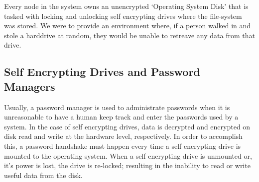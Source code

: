 \documentclass[11pt]{article} %
\def\pm{password manager\xspace}
\def\sed{self encrypting drive\xspace}
\def\seds{\sed{s}\xspace}
\begin{document}
\begin{center}
\end{center}

Every node in the system owns an unencrypted `Operating System Disk' that is tasked with locking and unlocking \seds where the file-system was stored. We were to provide an environment where, if a person walked in and stole a harddrive at random, they would be unable to retreave any data from that drive.

\subsection*{Self Encrypting Drives and Password Managers}

Usually, a \pm is used to administrate passwords when it is unreasonable to have a human keep track and enter the passwords used by a system. In the case of \seds, data is decrypted and encrypted on disk read and write at the hardware level, respectively. In order to accomplish this, a password handshake must happen every time a \sed is mounted to the operating system. When a \sed is unmounted or, it's power is lost, the drive is re-locked; resulting in the inability to read or write useful data from the disk.
\end{document}
